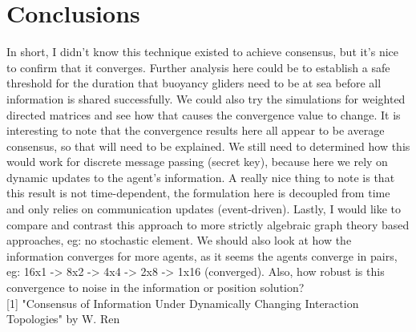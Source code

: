 \documentclass[12pt]{article}
\begin{document}
\section{Conclusions}\label{conclusions}
In short, I didn't know this technique existed to achieve consensus, but it's nice to confirm that it converges. Further analysis here could be to establish a safe threshold for the duration that buoyancy gliders need to be at sea before all information is shared successfully. We could also try the simulations for weighted directed matrices and see how that causes the convergence value to change. It is interesting to note that the convergence results here all appear to be average consensus, so that will need to be explained. We still need to determined how this would work for discrete message passing (secret key), because here we rely on dynamic updates to the agent's information. A really nice thing to note is that this result is not time-dependent, the formulation here is decoupled from time and only relies on communication updates (event-driven). Lastly, I would like to compare and contrast this approach to more strictly algebraic graph theory based approaches, eg: no stochastic element. We should also look at how the information converges for more agents, as it seems the agents converge in pairs, eg: 16x1 -> 8x2 -> 4x4 -> 2x8 -> 1x16 (converged). Also, how robust is this convergence to noise in the information or position solution? \\

[1] "Consensus of Information Under Dynamically Changing Interaction Topologies" by W. Ren



\end{document}
